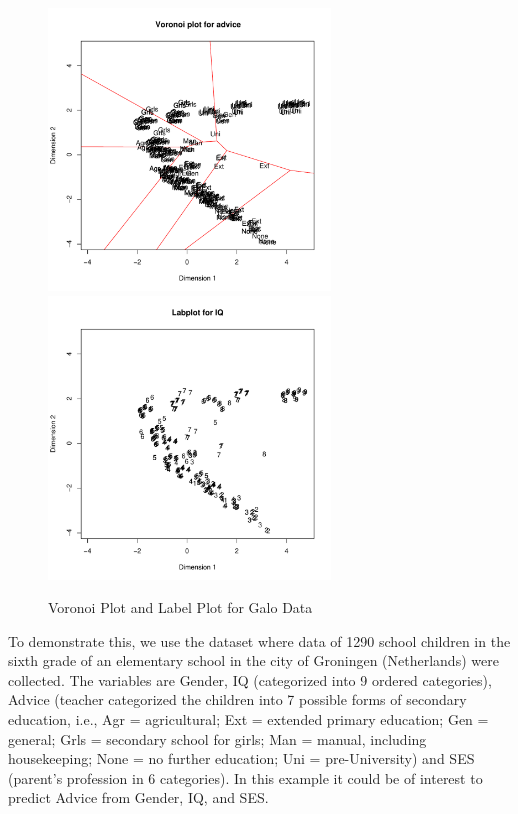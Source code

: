 \documentclass[article]{jss1}
\begin{document}
\begin{figure}[hbt]
\begin{center}
\includegraphics[height=75mm, width=75mm]{galoVor.pdf}
\includegraphics[height=75mm, width=75mm]{galoLab.pdf}
\caption{\label{fig:vor}Voronoi Plot and Label Plot for Galo Data}
\end{center}
\end{figure}

To demonstrate this, we use the  dataset \citep{Peschar:75} where data of 1290 school children in the sixth grade of an elementary school in the city of Groningen (Netherlands) were collected. The variables are Gender, IQ (categorized into 9 ordered categories), Advice (teacher categorized the children into 7 possible forms of secondary education, i.e., Agr = agricultural; Ext = extended primary education; Gen = general; 
Grls = secondary school for girls; Man = manual, including housekeeping; 
None = no further education; Uni = pre-University) and SES (parent's profession in 6 categories). In this example it could be of interest to predict Advice from Gender, IQ, and SES.
\end{document}
